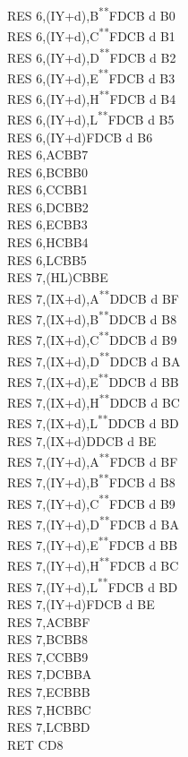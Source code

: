 \documentclass[twoside,openright,a4paper]{book}
\newcommand{\UNDOC}{\textnormal{\textsuperscript{**}}}
\begin{document}
\begin{multicols}{3}
{\begin{tabbing}
	RES 6,(IY+d),B\UNDOC\>FDCB d B0\\
	RES 6,(IY+d),C\UNDOC\>FDCB d B1\\
	RES 6,(IY+d),D\UNDOC\>FDCB d B2\\
	RES 6,(IY+d),E\UNDOC\>FDCB d B3\\
	RES 6,(IY+d),H\UNDOC\>FDCB d B4\\
	RES 6,(IY+d),L\UNDOC\>FDCB d B5\\
	RES 6,(IY+d)\>FDCB d B6\\
	RES 6,A\>CBB7\\
	RES 6,B\>CBB0\\
	RES 6,C\>CBB1\\
	RES 6,D\>CBB2\\
	RES 6,E\>CBB3\\
	RES 6,H\>CBB4\\
	RES 6,L\>CBB5\\
	RES 7,(HL)\>CBBE\\
	RES 7,(IX+d),A\UNDOC\>DDCB d BF\\
	RES 7,(IX+d),B\UNDOC\>DDCB d B8\\
	RES 7,(IX+d),C\UNDOC\>DDCB d B9\\
	RES 7,(IX+d),D\UNDOC\>DDCB d BA\\
	RES 7,(IX+d),E\UNDOC\>DDCB d BB\\
	RES 7,(IX+d),H\UNDOC\>DDCB d BC\\
	RES 7,(IX+d),L\UNDOC\>DDCB d BD\\
	RES 7,(IX+d)\>DDCB d BE\\
	RES 7,(IY+d),A\UNDOC\>FDCB d BF\\
	RES 7,(IY+d),B\UNDOC\>FDCB d B8\\
	RES 7,(IY+d),C\UNDOC\>FDCB d B9\\
	RES 7,(IY+d),D\UNDOC\>FDCB d BA\\
	RES 7,(IY+d),E\UNDOC\>FDCB d BB\\
	RES 7,(IY+d),H\UNDOC\>FDCB d BC\\
	RES 7,(IY+d),L\UNDOC\>FDCB d BD\\
	RES 7,(IY+d)\>FDCB d BE\\
	RES 7,A\>CBBF\\
	RES 7,B\>CBB8\\
	RES 7,C\>CBB9\\
	RES 7,D\>CBBA\\
	RES 7,E\>CBBB\\
	RES 7,H\>CBBC\\
	RES 7,L\>CBBD\\
	RET C\>D8\\

\end{tabbing}}
\end{multicols}
\end{document}
